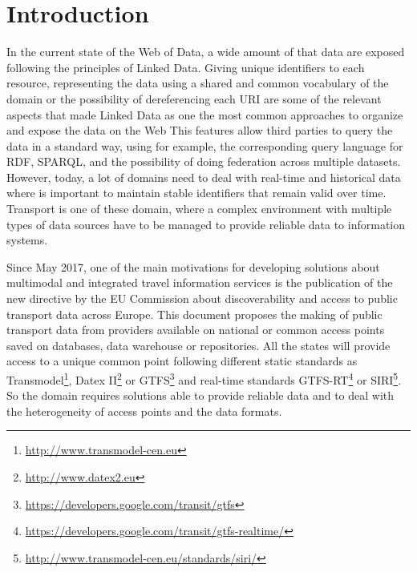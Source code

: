 \documentclass[sw]{iosart2x}
\begin{document}


\section{Introduction}\label{introduction} %
In the current state of the Web of Data, a wide amount of that data are exposed following the principles of Linked Data\cite{bizer2009linked}. Giving unique identifiers to each resource, representing the data using a shared and common vocabulary of the domain or the possibility of dereferencing each URI are some of the relevant aspects that made Linked Data as one the most common approaches to organize and expose the data on the Web\cite{heath2011linked} This features allow third parties to query the data in a standard way, using for example, the corresponding query language for RDF, SPARQL\cite{prud2006sparql}, and the possibility of doing federation across multiple datasets\cite{buil2013federating}. However, today, a lot of domains need to deal with real-time and historical data where is important to maintain stable identifiers that remain valid over time. Transport is one of these domain, where a complex environment with multiple types of data sources have to be managed to provide reliable data to information systems.

Since May 2017, one of the main motivations for developing solutions about multimodal and integrated travel information services is the publication of the new directive by the EU Commission about discoverability and access to public transport data across Europe. This document proposes the making of public transport data from providers available on national or common access points saved on databases, data warehouse or repositories. All the states will provide access to a unique common point following different static standards as Transmodel\footnote{\url{http://www.transmodel-cen.eu}}, Datex II\footnote{\url{http://www.datex2.eu}} or GTFS\footnote{\url{https://developers.google.com/transit/gtfs}} and real-time standards GTFS-RT\footnote{\url{https://developers.google.com/transit/gtfs-realtime/}} or SIRI\footnote{\url{http://www.transmodel-cen.eu/standards/siri/}}. So the domain requires solutions able to provide reliable data and to deal with the heterogeneity of access points and the data formats.
\end{document}
